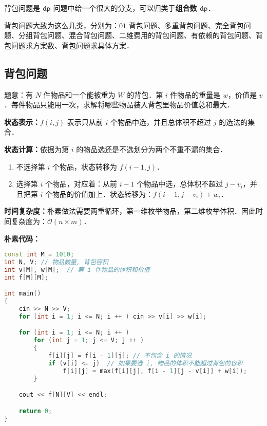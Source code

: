 
背包问题是 $\tt dp$ 问题中给一个很大的分支，可以归类于\textbf{组合数 $\tt dp$}．

背包问题大致为这么几类，分别为：$01$ 背包问题、多重背包问题、完全背包问题、分组背包问题、混合背包问题、二维费用的背包问题、有依赖的背包问题、背包问题求方案数、背包问题求具体方案．

\subsection{背包问题}

题意：有 $N$ 件物品和一个能被重为 $W$ 的背包．第 $i$ 件物品的重量是 $w$，价值是 $v$ ．每件物品只能用一次，求解将哪些物品装入背包里物品价值总和最大．

\textbf{状态表示：}$f(i, j)$ 表示只从前 $i$ 个物品中选，并且总体积不超过 $j$ 的选法的集合．

\textbf{
状态计算：}依据为第 $i$ 的物品选还是不选划分为两个不重不漏的集合．

\begin{enumerate}
\item 不选择第 $i$ 个物品，状态转移为 $f(i - 1, j)$．
\item 选择第 $i$ 个物品，对应着：从前 $i - 1$ 个物品中选，总体积不超过 $j - v_i$，并且把第 $i$ 个物品的价值加上．状态转移为：$f(i - 1, j - v_i) + w_i$．
\end{enumerate}

\textbf{时间复杂度：}朴素做法需要两重循环，第一维枚举物品，第二维枚举体积．因此时间复杂度为：$\mathcal{O}(n \times m)$．

\textbf{朴素代码：}

\begin{lstlisting}[language=cpp]
const int M = 1010;
int N, V; // 物品数量, 背包容积
int v[M], w[M];  // 第 i 件物品的体积和价值
int f[M][M];

int main()
{
    cin >> N >> V;
    for (int i = 1; i <= N; i ++ ) cin >> v[i] >> w[i];

    for (int i = 1; i <= N; i ++ )
        for (int j = 1; j <= V; j ++ )
        {
            f[i][j] = f[i - 1][j]; // 不包含 i 的情况
            if (v[i] <= j)  // 如果要选 i, 物品的体积不能超过背包的容积
                f[i][j] = max(f[i][j], f[i - 1][j - v[i]] + w[i]);
        }

    cout << f[N][V] << endl;

    return 0;
}
\end{lstlisting}

